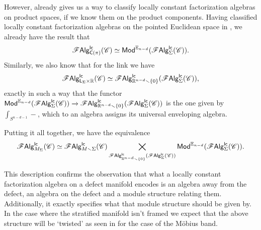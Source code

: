 \documentclass[../text.tex]{subfiles}
\begin{document}
However,  already gives us a way to classify locally constant factorization algebras on product spaces, if we know them on the product components. Having classified locally constant factorization algebras on the pointed Euclidean space in , we already have the result that
%
\begin{equation}
    \lcfa_{\cone(\pi)} (\catC) \simeq \mathsf{Mod}^{\mathbb{E}_{n-d}} (\lcfa_{\Sigma} (\catC)).
\end{equation}
%
Similarly, we also know that for the link we have
%
%
\begin{equation}
    \mathscr{F} \mathsf{Alg}^{\mathsf{lc}}_{\mathsf{L}_{\Sigma} \times \mathbb{R}} (\mathscr{C}) \simeq \mathscr{F} \mathsf{Alg}^{\mathsf{lc}}_{\mathbb{R}^{n-d} \smallsetminus \{ 0\} } (\mathscr{F} \mathsf{Alg}^{\mathsf{lc}}_{\Sigma} (\mathscr{C})),
\end{equation}
%
exactly in such a way that the functor $\mathsf{Mod}^{\mathbb{E}_{n-d}} (\mathscr{F} \mathsf{Alg}^{\mathsf{lc}}_{\Sigma} (\mathscr{C})) \xrightarrow{} \mathscr{F} \mathsf{Alg}^{\mathsf{lc}}_{\mathbb{R}^{n-d} \smallsetminus \{ 0\} } (\mathscr{F} \mathsf{Alg}^{\mathsf{lc}}_{\Sigma} (\mathscr{C}))$ is the one given by $\int_{S^{n-d-1}} -$, which to an algebra assigns its universal enveloping algebra.

Putting it all together, we have the equivalence
%
\begin{equation}
    \mathscr{F} \mathsf{Alg}^{\mathsf{lc}}_{M_\Sigma} (\mathscr{C}) \simeq \mathscr{F} \mathsf{Alg}^{\mathsf{lc}}_{M \smallsetminus \Sigma} (\mathscr{C}) \bigtimes_{\mathscr{F} \mathsf{Alg}^{\mathsf{lc}}_{\mathbb{R}^{n-d} \smallsetminus \{0\}} (\mathscr{F} \mathsf{Alg}^{\mathsf{lc}}_{\Sigma} (\mathscr{C}))} \mathsf{Mod}^{\mathbb{E}_{n-d}} (\mathscr{F} \mathsf{Alg}^{\mathsf{lc}}_{\Sigma} (\mathscr{C})).
\end{equation}

This description confirms the observation that what a locally constant factorization algebra on a defect manifold encodes is an algebra away from the defect, an algebra on the defect and a module structure relating them. Additionally, it exactly specifies what that module structure should be given by. In the case where the stratified manifold isn't framed we expect that the above structure will be `twisted' as seen in  for the case of the M\"obius band.
\end{document}
